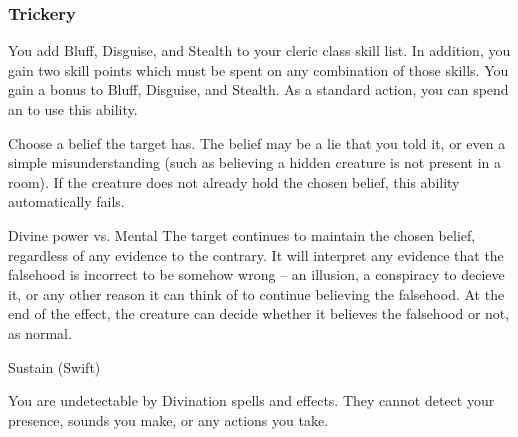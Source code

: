         \subsubsection{Trickery}
             You add Bluff, Disguise, and Stealth to your cleric class skill list.
            In addition, you gain two skill points which must be spent on any combination of those skills.
             You gain a  bonus to Bluff, Disguise, and Stealth.
             As a standard action, you can spend an  to use this ability.
            \begin{ability}
                \begin{spelltargetinginfo}
                    \spellspecial Choose a belief the target has.
                    The belief may be a lie that you told it, or even a simple misunderstanding (such as believing a hidden creature is not present in a room).
                    If the creature does not already hold the chosen belief, this ability automatically fails.
                \end{spelltargetinginfo}
                \begin{spelleffects}
                    \begin{spellattack}{Divine power vs. Mental}
                        \spellsuccess The target continues to maintain the chosen belief, regardless of any evidence to the contrary.
                        It will interpret any evidence that the falsehood is incorrect to be somehow wrong -- an illusion, a conspiracy to decieve it, or any other reason it can think of to continue believing the falsehood.
                        At the end of the effect, the creature can decide whether it believes the falsehood or not, as normal.
                    \end{spellattack}
                    \spelldur Sustain (Swift)
                \end{spelleffects}
            \end{ability}
             You are undetectable by Divination spells and effects.
            They cannot detect your presence, sounds you make, or any actions you take.

